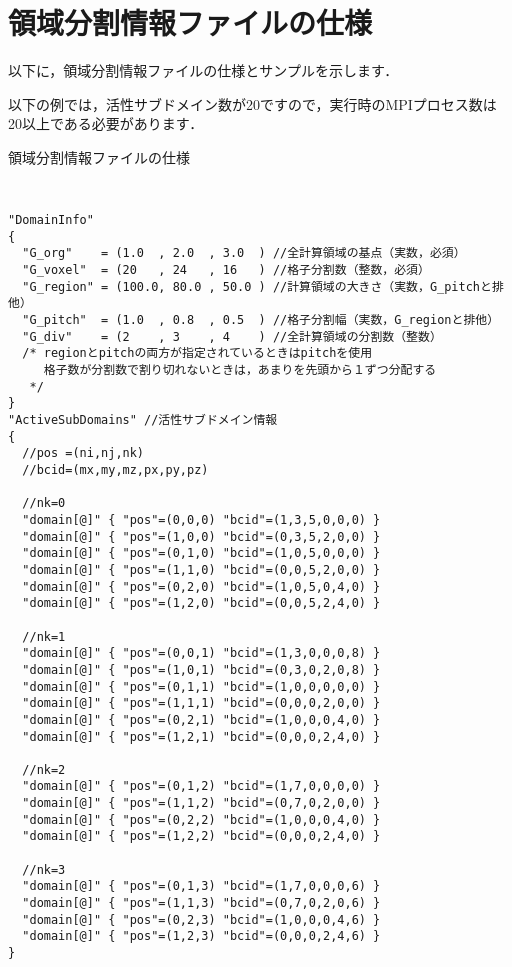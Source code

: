 \section{領域分割情報ファイルの仕様}
\label{domInfoFile}

以下に，領域分割情報ファイルの仕様とサンプルを示します．

以下の例では，活性サブドメイン数が20ですので，実行時のMPIプロセス数は
20以上である必要があります．

\begin{spacing}{0.65}
\begin{itembox}[l]{領域分割情報ファイルの仕様}
{\tt
\begin{verbatim}
"DomainInfo"
{
  "G_org"    = (1.0  , 2.0  , 3.0  ) //全計算領域の基点（実数，必須）
  "G_voxel"  = (20   , 24   , 16   ) //格子分割数（整数，必須）
  "G_region" = (100.0, 80.0 , 50.0 ) //計算領域の大きさ（実数，G_pitchと排他）
  "G_pitch"  = (1.0  , 0.8  , 0.5  ) //格子分割幅（実数，G_regionと排他）
  "G_div"    = (2    , 3    , 4    ) //全計算領域の分割数（整数）
  /* regionとpitchの両方が指定されているときはpitchを使用
     格子数が分割数で割り切れないときは，あまりを先頭から１ずつ分配する
   */
}
"ActiveSubDomains" //活性サブドメイン情報
{
  //pos =(ni,nj,nk)
  //bcid=(mx,my,mz,px,py,pz)

  //nk=0
  "domain[@]" { "pos"=(0,0,0) "bcid"=(1,3,5,0,0,0) }
  "domain[@]" { "pos"=(1,0,0) "bcid"=(0,3,5,2,0,0) }
  "domain[@]" { "pos"=(0,1,0) "bcid"=(1,0,5,0,0,0) }
  "domain[@]" { "pos"=(1,1,0) "bcid"=(0,0,5,2,0,0) }
  "domain[@]" { "pos"=(0,2,0) "bcid"=(1,0,5,0,4,0) }
  "domain[@]" { "pos"=(1,2,0) "bcid"=(0,0,5,2,4,0) }

  //nk=1
  "domain[@]" { "pos"=(0,0,1) "bcid"=(1,3,0,0,0,8) }
  "domain[@]" { "pos"=(1,0,1) "bcid"=(0,3,0,2,0,8) }
  "domain[@]" { "pos"=(0,1,1) "bcid"=(1,0,0,0,0,0) }
  "domain[@]" { "pos"=(1,1,1) "bcid"=(0,0,0,2,0,0) }
  "domain[@]" { "pos"=(0,2,1) "bcid"=(1,0,0,0,4,0) }
  "domain[@]" { "pos"=(1,2,1) "bcid"=(0,0,0,2,4,0) }

  //nk=2
  "domain[@]" { "pos"=(0,1,2) "bcid"=(1,7,0,0,0,0) }
  "domain[@]" { "pos"=(1,1,2) "bcid"=(0,7,0,2,0,0) }
  "domain[@]" { "pos"=(0,2,2) "bcid"=(1,0,0,0,4,0) }
  "domain[@]" { "pos"=(1,2,2) "bcid"=(0,0,0,2,4,0) }

  //nk=3
  "domain[@]" { "pos"=(0,1,3) "bcid"=(1,7,0,0,0,6) }
  "domain[@]" { "pos"=(1,1,3) "bcid"=(0,7,0,2,0,6) }
  "domain[@]" { "pos"=(0,2,3) "bcid"=(1,0,0,0,4,6) }
  "domain[@]" { "pos"=(1,2,3) "bcid"=(0,0,0,2,4,6) }
}
\end{verbatim}
}
\end{itembox}
\end{spacing}

\clearpage
